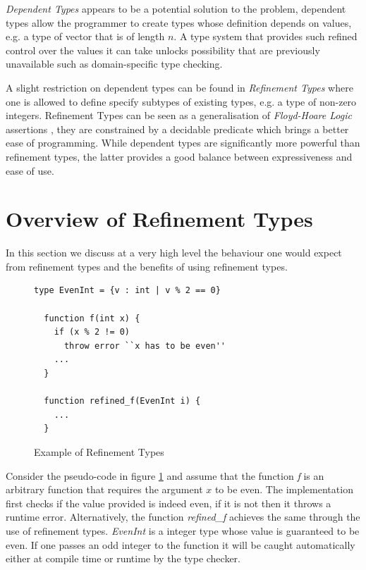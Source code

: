 \documentclass[a4paper,12pt]{report}
\begin{document}
\par
\textit{Dependent Types} \cite{depenTypeAtWork} appears to be a potential solution 
to the problem, dependent types allow the programmer to create types whose 
definition depends on values, e.g. a type of vector that is of length $n$. 
A type system that provides such refined control over the values it 
can take unlocks possibility that are previously unavailable such as 
domain-specific type checking.

\par
A slight restriction on dependent types can be found in \textit{Refinement 
Types} \cite{refinementTypes} where one is allowed to define specify subtypes 
of existing types, e.g. a type of non-zero integers. Refinement Types can be 
seen as a generalisation of \emph{Floyd-Hoare Logic} assertions \cite{localRefTyping},  
they are constrained by a decidable predicate which brings a 
better ease of programming. While dependent types are significantly 
more powerful than refinement types, the latter provides a good balance between 
expressiveness and ease of use.

\section{Overview of Refinement Types}
In this section we discuss at a very high level the behaviour one would 
expect from refinement types and the benefits of using refinement types. 

\begin{figure}[h] 
  \begin{lstlisting}[mathescape=true] 
  type EvenInt = {v : int | v % 2 == 0}
  
  function f(int x) {
    if (x % 2 != 0) 
      throw error ``x has to be even''
    ...
  }
  
  function refined_f(EvenInt i) {
    ...
  }
  \end{lstlisting}
  \caption{Example of Refinement Types}
  \label{code:refine}
\end{figure}

\par
Consider the pseudo-code in figure \ref{code:refine} and assume that the function 
\textit{f} is an arbitrary function that requires the argument $x$ to be even.
The implementation first checks if the value provided is indeed even, if it 
is not then it throws a runtime error. Alternatively, the function \textit{refined\_f} 
achieves the same through the use of refinement types. \textit{EvenInt} is a 
integer type whose value is guaranteed to be even. If one passes an odd integer 
to the function it will be caught automatically either at compile time or 
runtime by the type checker. 
\end{document}
